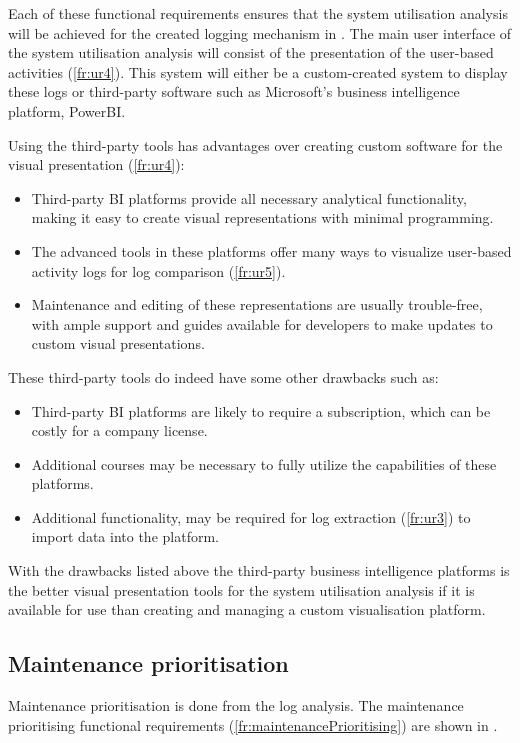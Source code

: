 Each of these functional requirements ensures that the system utilisation analysis will be achieved for the created logging mechanism in . The main user interface of the system utilisation analysis will consist of the presentation of the user-based activities (\ref{fr:ur4}). This system will either be a custom-created system to display these logs or third-party software such as Microsoft's business intelligence platform, PowerBI. \par Using the third-party tools has advantages over creating custom software for the visual presentation (\ref{fr:ur4}):

\begin{itemize}
	\item \RaggedRight Third-party BI platforms provide all necessary analytical functionality, making it easy to create visual representations with minimal programming.
	\item \RaggedRight The advanced tools in these platforms offer many ways to visualize user-based activity logs for log comparison (\ref{fr:ur5}).
	\item \RaggedRight Maintenance and editing of these representations are usually trouble-free, with ample support and guides available for developers to make updates to custom visual presentations.
	\end{itemize}

These third-party tools do indeed have some other drawbacks such as:

\begin{itemize}
	\item \RaggedRight Third-party BI platforms are likely to require a subscription, which can be costly for a company license.
	\item \RaggedRight Additional courses may be necessary to fully utilize the capabilities of these platforms.
	\item \RaggedRight Additional functionality, may be required for log extraction (\ref{fr:ur3}) to import data into the platform.
	\end{itemize}

With the drawbacks listed above the third-party business intelligence platforms is the better visual presentation tools for the system utilisation analysis if it is available for use than creating and managing a custom visualisation platform.

\subsection{Maintenance prioritisation}\label{sec:ch2_utilisationImprovements}
Maintenance prioritisation is done from the log analysis. The maintenance prioritising functional requirements (\ref{fr:maintenancePrioritising}) are shown in .

